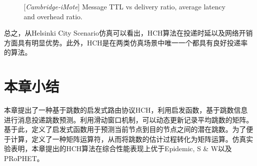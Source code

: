 \begin{figure}[tbp]
\centering
{}
\caption{[\emph{Cambridge-iMote}] Message TTL vs delivery ratio, average latency and overhead ratio.}
\label{fig:chap5_realtrace_ttl}
\end{figure}

总之，从Helsinki City Scenario仿真可以看出，HCH算法在投递时延以及网络开销方面具有明显优势。此外，HCH是在两类仿真场景中唯一一个都具有良好投递率的算法。

\section{本章小结}
\label{chap5:本章小结}

本章提出了一种基于跳数的启发式路由协议HCH，利用启发函数，基于跳数信息进行消息投递跳数预测。利用滑动窗口机制，可以动态更新记录平均跳数的矩阵。基于此，定义了启发式函数用于预测当前节点到目的节点之间的潜在跳数。为了便于计算，定义了一种矩阵运算符，从而将跳数的估计过程转化为矩阵运算。仿真实验表明，本章提出的HCH算法在综合性能表现上优于Epidemic, S \& W以及PRoPHET。
